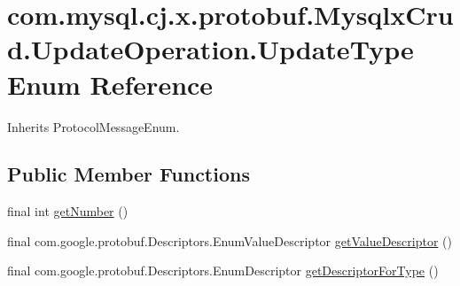 \hypertarget{enumcom_1_1mysql_1_1cj_1_1x_1_1protobuf_1_1_mysqlx_crud_1_1_update_operation_1_1_update_type}{}\section{com.\+mysql.\+cj.\+x.\+protobuf.\+Mysqlx\+Crud.\+Update\+Operation.\+Update\+Type Enum Reference}
\label{enumcom_1_1mysql_1_1cj_1_1x_1_1protobuf_1_1_mysqlx_crud_1_1_update_operation_1_1_update_type}


Inherits Protocol\+Message\+Enum.

\subsection*{Public Member Functions}
\begin{DoxyCompactItemize}
\item 
final int \mbox{\hyperlink{enumcom_1_1mysql_1_1cj_1_1x_1_1protobuf_1_1_mysqlx_crud_1_1_update_operation_1_1_update_type_a3842696acafec908befaae0a1a1f7b3e}{get\+Number}} ()
\item 
final com.\+google.\+protobuf.\+Descriptors.\+Enum\+Value\+Descriptor \mbox{\hyperlink{enumcom_1_1mysql_1_1cj_1_1x_1_1protobuf_1_1_mysqlx_crud_1_1_update_operation_1_1_update_type_a5dadb1bbf62a697ea0f0662452756ae5}{get\+Value\+Descriptor}} ()
\item 
final com.\+google.\+protobuf.\+Descriptors.\+Enum\+Descriptor \mbox{\hyperlink{enumcom_1_1mysql_1_1cj_1_1x_1_1protobuf_1_1_mysqlx_crud_1_1_update_operation_1_1_update_type_a80a3f7fb831e95666b6fc9b451c73da5}{get\+Descriptor\+For\+Type}} ()
\end{DoxyCompactItemize}
